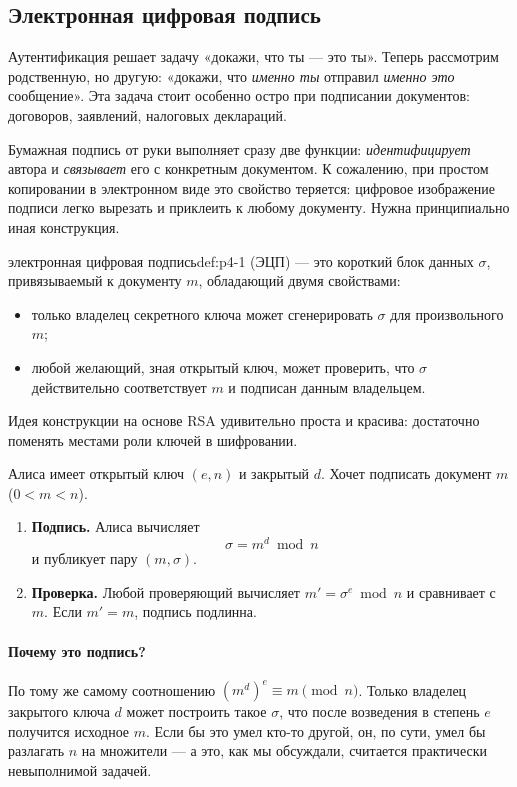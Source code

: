 \subsection{Электронная цифровая подпись}
\label{subsec:eds}

Аутентификация решает задачу «докажи, что ты --- это ты». Теперь рассмотрим родственную, но другую: «докажи, что \emph{именно ты} отправил \emph{именно это} сообщение». Эта задача стоит особенно остро при подписании документов: договоров, заявлений, налоговых деклараций.

Бумажная подпись от руки выполняет сразу две функции: \emph{идентифицирует} автора и \emph{связывает} его с конкретным документом. К сожалению, при простом копировании в электронном виде это свойство теряется: цифровое изображение подписи легко вырезать и приклеить к любому документу. Нужна принципиально иная конструкция.

\begin{definition}{электронная цифровая подпись}{def:p4-1}
 (ЭЦП) --- это короткий блок данных $\sigma$, привязываемый к документу $m$, обладающий двумя свойствами:
\begin{itemize}
  \item только владелец секретного ключа может сгенерировать $\sigma$ для произвольного $m$;
  \item любой желающий, зная открытый ключ, может проверить, что $\sigma$ действительно соответствует $m$ и подписан данным владельцем.
\end{itemize}
\end{definition}

Идея конструкции на основе RSA удивительно проста и красива: достаточно поменять местами роли ключей в шифровании.

\begin{algorithmbox}[title={Алгоритм: цифровая подпись RSA}]
Алиса имеет открытый ключ $(e, n)$ и закрытый $d$. Хочет подписать документ $m$ ($0 < m < n$).
\begin{enumerate}
  \item \textbf{Подпись.} Алиса вычисляет
  \[
    \sigma = m^{d} \bmod n
  \]
  и публикует пару $(m, \sigma)$.
  \item \textbf{Проверка.} Любой проверяющий вычисляет $m' = \sigma^{e} \bmod n$ и сравнивает с $m$. Если $m' = m$, подпись подлинна.
\end{enumerate}
\end{algorithmbox}

\paragraph*{Почему это подпись?} По тому же самому соотношению $(m^{d})^{e} \equiv m \pmod n$. Только владелец закрытого ключа $d$ может построить такое $\sigma$, что после возведения в степень $e$ получится исходное $m$. Если бы это умел кто-то другой, он, по сути, умел бы разлагать $n$ на множители --- а это, как мы обсуждали, считается практически невыполнимой задачей.

